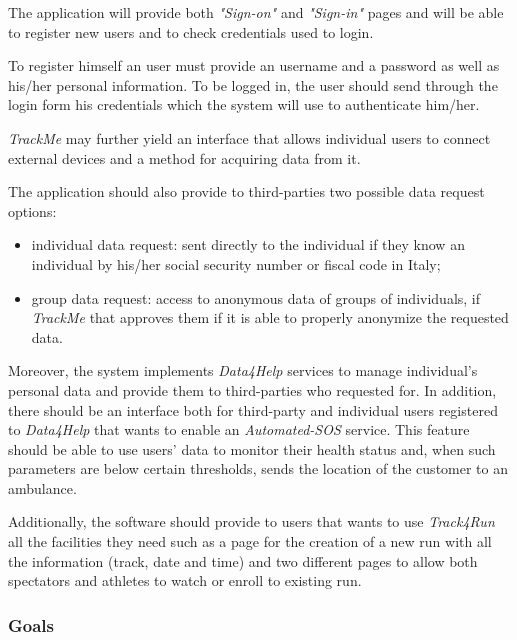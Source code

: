 \documentclass[a4paper]{article}
\begin{document}
        The application will provide both \textit{"Sign-on"} and \textit{"Sign-in"} pages and will be able to register new users and to check credentials used to login.
        
        To register himself an user must provide an username and a password as well as his/her personal information. To be logged in, the user should send through the login form his credentials which the system will use to authenticate him/her.
        
        \textit{TrackMe} may further yield an interface that allows individual users to connect external devices and a method for acquiring data from it.
        
        The application should also provide to third-parties two possible data request options:
        \begin{itemize}
            \item individual data request: sent directly to the individual if they know an  individual by his/her social security number or fiscal code in Italy;
            \item group data request: access  to  anonymous  data  of  groups  of  individuals, if \textit{TrackMe}  that  approves  them  if  it  is  able  to  properly  anonymize  the  requested  data.
        \end{itemize}
        
        Moreover, the system implements \textit{Data4Help} services to manage individual's personal data and provide them to third-parties who requested for. In addition, there should be an interface both for third-party and individual users registered to \textit{Data4Help} that wants to enable an \textit{Automated-SOS} service. This feature should be able to use users' data to monitor their health status and, when such parameters are below certain thresholds, sends the location of the customer to an ambulance.
        
        Additionally, the software should provide to users that wants to use \textit{Track4Run} all the facilities they need such as a page for the creation of a new run with all the information (track, date and time) and two different pages to allow both spectators and athletes to watch or enroll to existing run.
        
        \subsubsection{Goals}
        
\end{document}
